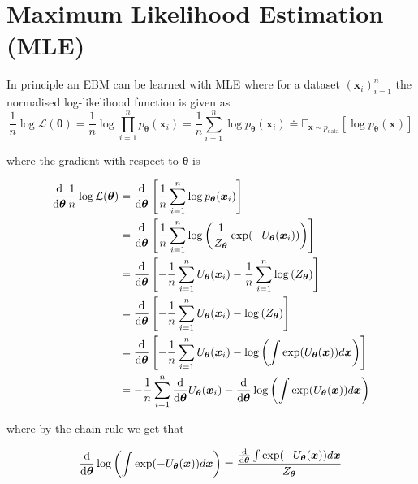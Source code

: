 
\section{Maximum Likelihood Estimation (MLE)}

In principle an EBM can be learned with MLE where for a dataset $(\bm{x}_i)_{i=1}^n$ the normalised log-likelihood function is given as
\[
	\frac{1}{n} \log \mathcal{L}(\bm{\theta}) 
	= \frac{1}{n} \log \prod_{i=1}^n p_{\bm{\theta}}(\bm{x}_i)
	= \frac{1}{n} \sum_{i=1}^n \log p_{\bm{\theta}}(\bm{x}_i) \doteq \mathbb{E}_{ \bm{x} \sim p_{\text{data}} } [\log p_{\bm{\theta}}(\bm{x}) ]
\]

where the gradient with respect to $\bm{\theta}$ is

\[
\begin{aligned}
	\frac{\dif}{\dif \bm{\theta}} \frac{1}{n} \log \mathcal{L}(\bm{\theta}) 
	&= \frac{\dif}{\dif \bm{\theta}} \left[ \frac{1}{n} \sum_{i=1}^n \log p_{\bm{\theta}}(\bm{x}_i) \right] \\
	&= \frac{\dif}{\dif \bm{\theta}} \left[ \frac{1}{n} \sum_{i=1}^n \log \left( \frac{1}{Z_{\bm{\theta}}} \exp( - U_{\bm{\theta}} (\bm{x}_i) ) \right) \right] \\
	&= \frac{\dif}{\dif \bm{\theta}} \left[ - \frac{1}{n} \sum_{i=1}^n U_{\bm{\theta}} (\bm{x}_i)  - \frac{1}{n} \sum_{i=1}^n \log \left( Z_{\bm{\theta}} \right) \right] \\
	&= \frac{\dif}{\dif \bm{\theta}} \left[ - \frac{1}{n} \sum_{i=1}^n U_{\bm{\theta}} (\bm{x}_i)  - \log \left( Z_{\bm{\theta}} \right) \right] \\
	&= \frac{\dif}{\dif \bm{\theta}} \left[ - \frac{1}{n} \sum_{i=1}^n U_{\bm{\theta}} (\bm{x}_i)  - \log \left( \int \exp( U_{\bm{\theta}} (\bm{x}) ) d\bm{x} \right) \right] \\
	&= - \frac{1}{n} \sum_{i=1}^n \frac{\dif}{\dif \bm{\theta}} U_{\bm{\theta}} (\bm{x}_i)  - \frac{\dif}{\dif \bm{\theta}}\log \left( \int \exp( U_{\bm{\theta}} (\bm{x}) ) d\bm{x} \right) \\
\end{aligned}
\]

where by the chain rule we get that

\[
	\frac{\mathop{}\!\mathrm{d}}{\mathop{}\!\mathrm{d} \bm{\theta}} \log \left( \int \exp( - U_{\bm{\theta}} (\bm{x}) ) d\bm{x} \right) 
	= \frac{\frac{\mathop{}\!\mathrm{d}}{\mathop{}\!\mathrm{d} \bm{\theta}} \int \exp( - U_{\bm{\theta}} (\bm{x}) ) d\bm{x} }{ Z_{\bm{\theta}} }\\
\]

